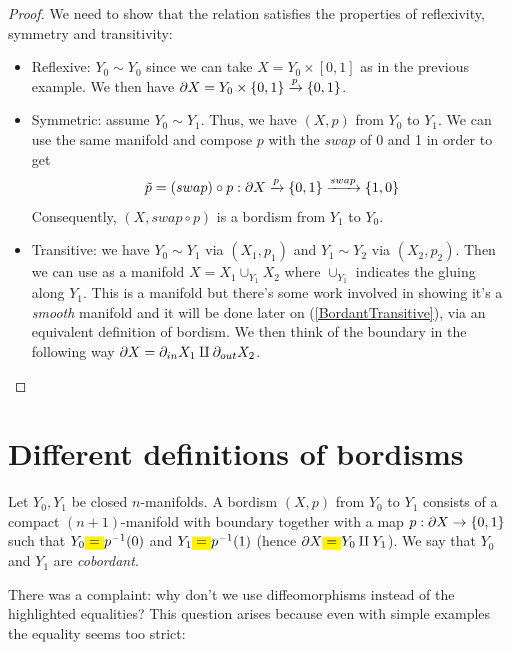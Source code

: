 \begin{proof}
We need to show that the relation satisfies the properties of reflexivity, symmetry and transitivity:
\begin{itemize}
    \item Reflexive: $Y_0 \sim Y_0$ since we can take $X = Y_0 \times [0,1]$ as in the previous example. We then have $\partial X = Y_0 \times \{0,1\} \xrightarrow{p} \{0,1\}$. 
    \item Symmetric: assume $Y_0 \sim Y_1$. Thus, we have $(X,p)$ from $Y_0$ to $Y_1$. We can use the same manifold and compose $p$ with the $swap$ of 0 and 1 in order to get 
    $$\tilde{p}=(swap) \circ p:\partial X\xrightarrow{p}\{0,1\}\xrightarrow{swap}\{1,0\}$$ Consequently, $(X, swap \circ p)$ is a bordism from $Y_1$ to $Y_0$.
    \item Transitive: we have $Y_0 \sim Y_1$ via $(X_1, p_1)$ and $Y_1 \sim Y_2$ via $(X_2, p_2)$. 
    Then we can use as a manifold $X = X_1 \cup_{Y_1} X_2$ where $\cup_{Y_1}$ indicates the gluing along $Y_1$. 
    This is a manifold but there's some work involved in showing it's a \textit{smooth} manifold and it will be done later 
    on (\ref{BordantTransitive}), via an equivalent definition of bordism. We then think of the boundary in the following
     way $\partial X = \partial_{in} X_1 \amalg \partial_{out} X_2$.
\end{itemize}
\end{proof}

\section{Different definitions of bordisms} %
\label{sec:different_definitions_of_bordisms}

\begin{rmnd}
Let $Y_0, Y_1$ be closed $n$-manifolds. A bordism $(X,p)$ from $Y_0$ to $Y_1$ consists of a compact $(n+1)$-manifold with boundary together with a map $p: \partial X \to \{0,1\}$ such that $Y_0 \text{\colorbox{yellow}{=}} p^{-1}(0)$ and $Y_1 \text{\colorbox{yellow}{=}} p^{-1}(1)$ (hence $\de X \text{\colorbox{yellow}{=}}  Y_0 \amalg Y_1$). We say that $Y_0$ and $Y_1$ are \textit{cobordant}.
\end{rmnd}

\noindent There was a complaint: why don't we use diffeomorphisms instead of the highlighted equalities? This question arises because even with simple examples the equality seems too strict:

